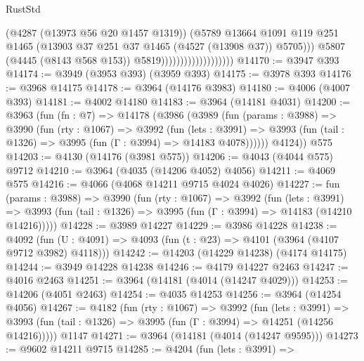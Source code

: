 \begin{lexlean}{RustStd}
\begin{coremodule}
{\begin{coremodule}
{{{{{{{{{{{{{{{{{{{{{{{{{{{{{{{{{{{{{{                                            (@4287 (@13973 @56 @20 @1457 @1319))
                                            (@5789
                                              @13664
                                              @1091
                                              @119
                                              @251
                                              @1465
                                              (@13903
                                                @37
                                                @251
                                                @37
                                                @1465
                                                (@4527 (@13908 @37))
                                                @5705)))
                                          @5807
                                          (@4445 (@8143 @568 @153))
                                          @5819)))))))))))))))))))
@14170 := @3947 @393
@14174 := @3949 (@3953 @393) (@3959 @393)
@14175 := @3978 @393
@14176 := @3968 @14175
@14178 := @3964 (@14176 @3983)
@14180 := @4006 (@4007 @393)
@14181 := @4002 @14180
@14183 := @3964 (@14181 @4031)
@14200 := @3963
    (fun (fn : @7) =>
    @14178
      (@3986
        (@3989
          (fun (params : @3988) =>
          @3990
            (fun (rty : @1067) =>
            @3992
              (fun (lets : @3991) =>
              @3993 (fun (tail : @1326) => @3995 (fun (Γ : @3994) => @14183 @4078))))))
        @4124))
    @575
@14203 := @4130 (@14176 (@3981 @575))
@14206 := @4043 (@4044 @575) @9712
@14210 := @3964 (@4035 (@14206 @4052) @4056)
@14211 := @4069 @575
@14216 := @4066 (@4068 @14211 @9715 @4024 @4026)
@14227 := fun (params : @3988) =>
  @3990
    (fun (rty : @1067) =>
    @3992
      (fun (lets : @3991) =>
      @3993 (fun (tail : @1326) => @3995 (fun (Γ : @3994) => @14183 (@14210 @14216)))))
@14228 := @3989 @14227
@14229 := @3986 @14228
@14238 := @4092
    (fun (U : @4091) => @4093 (fun (t : @23) => @4101 (@3964 (@4107 @9712 @3982) @4118)))
@14242 := @14203 (@14229 @14238) (@4174 @14175)
@14244 := @3949 @14228 @14238
@14246 := @4179 @14227 @2463
@14247 := @4016 @2463
@14251 := @3964 (@14181 (@4014 (@14247 @4029)))
@14253 := @14206 (@4051 @2463)
@14254 := @4035 @14253
@14256 := @3964 (@14254 @4056)
@14267 := @4182
    (fun (rty : @1067) =>
    @3992
      (fun (lets : @3991) =>
      @3993 (fun (tail : @1326) => @3995 (fun (Γ : @3994) => @14251 (@14256 @14216)))))
    @1147
@14271 := @3964 (@14181 (@4014 (@14247 @9595)))
@14273 := @9602 @14211 @9715
@14285 := @4204
    (fun (lets : @3991) =>
}}}}}}}}}}}}}}}}}}}}}}}}}}}}}}}}}}}}}}
\end{coremodule}}
\end{coremodule}
\end{lexlean}
